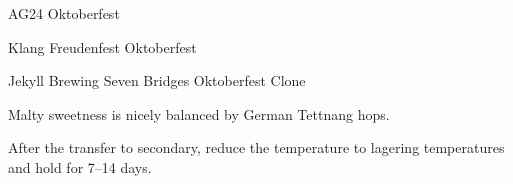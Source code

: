 \begin{recipe}{AG24 Oktoberfest}
\begin{recipe}{Klang Freudenfest Oktoberfest}
\end{recipe}

\begin{recipe}{Jekyll Brewing Seven Bridges Oktoberfest Clone} %

\begin{aboutblock}
Malty sweetness is nicely balanced by German Tettnang hops.
\sourceaha
\end{aboutblock}


\begin{methodandtiming}

\begin{mashsteps}
\end{mashsteps}

\begin{fermentationsteps}
\end{fermentationsteps}

\begin{directions}
After the transfer to secondary, reduce the temperature to lagering temperatures and
hold for 7--14 days.
\end{directions}

\end{methodandtiming}

\recipebreak

\begin{ingredientsblock}

\begin{malts}
\end{malts}

\begin{hops}
\end{hops}



\end{ingredientsblock}
\end{recipe}
\end{recipe}
